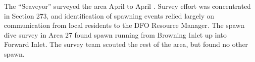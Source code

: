 The ``Seaveyor'' surveyed the area April  to April .
Survey eﬀort was concentrated in Section 273, and identiﬁcation of spawning events relied largely on communication from local residents to the DFO Resource Manager.
The spawn dive survey in Area 27 found spawn running from Browning Inlet up into Forward Inlet.
The survey team scouted the rest of the area, but found no other spawn.  
